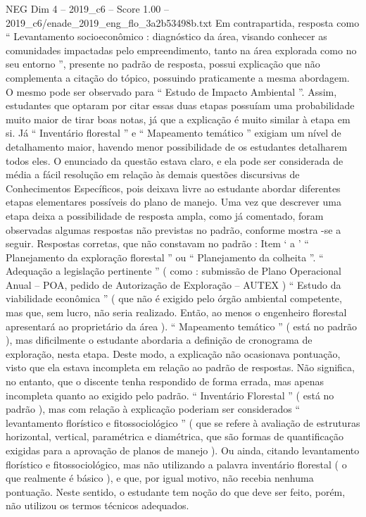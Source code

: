 \begin{textsample}{NEG Dim 4 – 2019\_c6 – Score 1.00 – 2019\_c6/enade\_2019\_eng\_flo\_3a2b53498b.txt}
Em contrapartida, resposta como “ Levantamento socioeconômico : diagnóstico da área, visando conhecer as comunidades impactadas pelo empreendimento, tanto na área explorada como no seu entorno ”, presente no padrão de resposta, possui explicação que não complementa a citação do tópico, possuindo praticamente a mesma abordagem.
O mesmo pode ser observado para “ Estudo de Impacto Ambiental ”.
Assim, estudantes que optaram por citar essas duas etapas possuíam uma probabilidade muito maior de tirar boas notas, já que a explicação é muito similar à etapa em si.
Já “ Inventário florestal ” e “ Mapeamento temático ” exigiam um nível de detalhamento maior, havendo menor possibilidade de os estudantes detalharem todos eles.
O enunciado da questão estava claro, e ela pode ser considerada de média a fácil resolução em relação às demais questões discursivas de Conhecimentos Específicos, pois deixava livre ao estudante abordar diferentes etapas elementares possíveis do plano de manejo.
Uma vez que descrever uma etapa deixa a possibilidade de resposta ampla, como já comentado, foram observadas algumas respostas não previstas no padrão, conforme mostra -se a seguir.
Respostas corretas, que não constavam no padrão : Item ‘ a ’ “ Planejamento da exploração florestal ” ou “ Planejamento da colheita ”. “ Adequação a legislação pertinente ” ( como : submissão de Plano Operacional Anual – POA, pedido de Autorização de Exploração – AUTEX ) “ Estudo da viabilidade econômica ” ( que não é exigido pelo órgão ambiental competente, mas que, sem lucro, não seria realizado.
Então, ao menos o engenheiro florestal apresentará ao proprietário da área ). “ Mapeamento temático ” ( está no padrão ), mas dificilmente o estudante abordaria a definição de cronograma de exploração, nesta etapa.
Deste modo, a explicação não ocasionava pontuação, visto que ela estava incompleta em relação ao padrão de respostas.
Não significa, no entanto, que o discente tenha respondido de forma errada, mas apenas incompleta quanto ao exigido pelo padrão. “ Inventário Florestal ” ( está no padrão ), mas com relação à explicação poderiam ser considerados “ levantamento florístico e fitossociológico ” ( que se refere à avaliação de estruturas horizontal, vertical, paramétrica e diamétrica, que são formas de quantificação exigidas para a aprovação de planos de manejo ).
Ou ainda, citando levantamento florístico e fitossociológico, mas não utilizando a palavra inventário florestal ( o que realmente é básico ), e que, por igual motivo, não recebia nenhuma pontuação.
Neste sentido, o estudante tem noção do que deve ser feito, porém, não utilizou os termos técnicos adequados.

\end{textsample}
